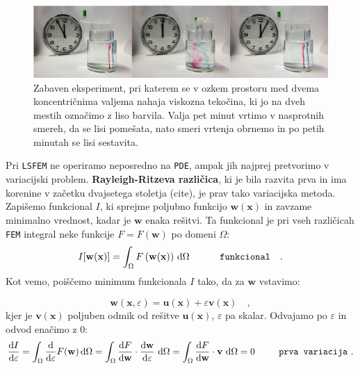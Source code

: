 \begin{figure}[ht]
	\includegraphics[width = 1\textwidth]{Slike/TaylorCouette}
	\caption{Zabaven eksperiment, pri katerem se v ozkem prostoru med dvema koncentričnima valjema nahaja viskozna tekočina, ki jo na dveh mestih označimo z liso barvila. Valja pet minut vrtimo v nasprotnih smereh, da se lisi pomešata, nato smeri vrtenja obrnemo in po petih minutah se lisi sestavita.}
	\label{fig:TaylorCouette}
\end{figure}

Pri \texttt{LSFEM} ne operiramo neposredno na \texttt{PDE}, ampak jih najprej pretvorimo v variacijski problem. \textbf{Rayleigh-Ritzeva različica}, ki je bila razvita prva in ima korenine v začetku dvajsetega stoletja (cite), je prav tako variacijska metoda. Zapišemo funkcional $I$, ki sprejme poljubno funkcijo $\mathbf{w}(\mathbf{x})$ in zavzame minimalno vrednost, kadar je $\mathbf{w}$ enaka rešitvi. Ta funkcional je pri vseh različicah \texttt{FEM} integral neke funkcije $F = F\left(\mathbf{w}\right)$ po domeni $\Omega$:
\begin{equation}
	I[\mathbf{w}(\mathbf{x})] = \int_{\Omega} F\left(\mathbf{w}(\mathbf{x})\right) \, \mathrm{d} \Omega \hspace{1.1cm} \texttt{funkcional} \quad .
\end{equation}
Kot vemo, poiščemo minimum funkcionala $I$ tako, da za $\mathbf{w}$ vstavimo:

\setlength{\textheight}{26.5cm}			%
\pagebreak
\setlength{\topmargin}{1.6cm}			%
\setlength{\headheight}{0.0cm}
\setlength{\headsep}{0.0cm}			%
\fancyhf{}
\fancyfoot[C]{\thepage}
\begin{equation}
	\mathbf{w}(\mathbf{x}, \varepsilon) = \mathbf{u}(\mathbf{x}) + \varepsilon \mathbf{v}(\mathbf{x}) \quad ,
\end{equation}
kjer je $\mathbf{v}(\mathbf{x})$ poljuben odmik od rešitve $\mathbf{u}(\mathbf{x})$, $\varepsilon$ pa skalar. Odvajamo po $\varepsilon$ in odvod enačimo z 0:
\begin{equation}
\frac{\mathrm{d} I}{\mathrm{d} \varepsilon} = \int_{\Omega} \frac{\mathrm{d}}{\mathrm{d} \varepsilon} F(\mathbf{w}) \, \mathrm{d} \Omega = \int_{\Omega} \frac{\mathrm{d} F}{\mathrm{d} \mathbf{w}} \cdot \frac{\mathrm{d} \mathbf{w}}{\mathrm{d} \varepsilon} \ \mathrm{d} \Omega = \int_{\Omega} \frac{\mathrm{d} F}{\mathrm{d} \mathbf{w}} \cdot \mathbf{v} \ \mathrm{d} \Omega = 0 \hspace{0.9cm} \texttt{prva variacija} \ .
\end{equation}

